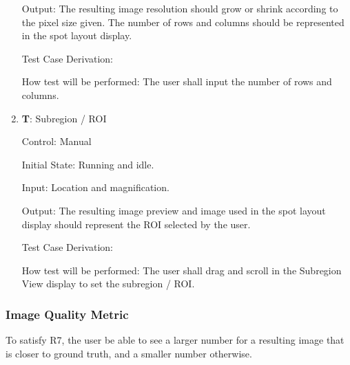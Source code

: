 \documentclass[12pt, titlepage]{article}
\newcounter{testnum} %
\begin{document}
\begin{enumerate}
    Output: The resulting image resolution should grow or shrink according to the pixel size given.
    The number of rows and columns should be represented in the spot layout display.

    Test Case Derivation: 

    How test will be performed: The user shall input the number of rows and columns.

    \item{\textbf{T\thetestnum \label{T_subregion}}: Subregion / ROI\\}

    Control: Manual
                
    Initial State: Running and idle.
              
    Input: Location and magnification.
              
    Output: The resulting image preview and image used in the spot layout display should represent the ROI selected by the user.

    Test Case Derivation: 

    How test will be performed: The user shall drag and scroll in the Subregion View display to set the subregion / ROI.

\end{enumerate}


\subsubsection{Image Quality Metric}

To satisfy R7, the user be able to see a larger number for a resulting image that is closer to ground truth, 
and a smaller number otherwise.
\end{document}
